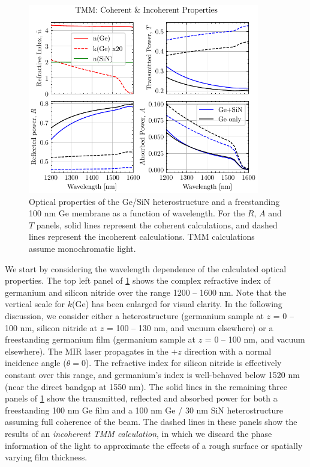 \begin{figure}
	\centering
	\includegraphics[width=0.9\textwidth]{figures/chap4/tmm_vs_WL_1200-1600nm.pdf}
	\caption{Optical properties of the Ge/SiN heterostructure and a freestanding 100 nm Ge membrane as a function of wavelength. For the $R$, $A$ and $T$ panels, solid lines represent the coherent calculations, and dashed lines represent the incoherent calculations. TMM calculations assume monochromatic light.}
	\label{fig:tmm_vs_WL_1200-1600nm}
\end{figure}

We start by considering the wavelength dependence of the calculated optical properties. The top left panel of \cref{fig:tmm_vs_WL_1200-1600nm} shows the complex refractive index of germanium and silicon nitride over the range 1200 -- 1600 nm. Note that the vertical scale for $k$(Ge) has been enlarged for visual clarity. In the following discussion, we consider either a heterostructure (germanium sample at {$z$ = 0 -- 100 nm}, silicon nitride at {$z$ = 100 -- 130 nm}, and vacuum elsewhere) or a freestanding germanium film (germanium sample at {$z$ = 0 -- 100 nm}, and vacuum elsewhere). The MIR laser propagates in the $+z$ direction with a normal incidence angle ($\theta = 0$). The refractive index for silicon nitride is effectively constant over this range, and germanium's index is well-behaved below 1520 nm (near the direct bandgap at 1550 nm). The solid lines in the remaining three panels of \cref{fig:tmm_vs_WL_1200-1600nm} show the transmitted, reflected and absorbed power for both a freestanding 100 nm Ge film and a 100 nm Ge / 30 nm SiN heterostructure assuming full coherence of the beam. The dashed lines in these panels show the results of an \textit{incoherent TMM calculation}, in which we discard the phase information of the light to approximate the effects of a rough surface or spatially varying film thickness.

